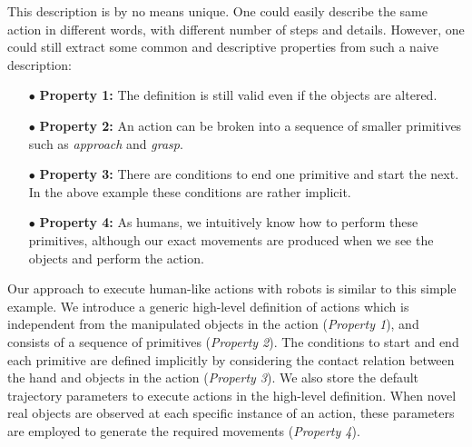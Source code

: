 This description is by no means unique.
One could easily describe the same action in different words, with different number of steps and  details.
However, one could still extract some common and descriptive properties from such a naive description:

\begin{itemize}
  \item[$\bullet$] \textbf{Property 1:} The definition is still valid even if the objects are altered.
  \item[$\bullet$] \textbf{Property 2:} An action can be broken into a sequence of smaller primitives such as \textit{approach} and \textit{grasp}.
  \item[$\bullet$] \textbf{Property 3:} There are conditions to end one primitive and start the next. In the above example these conditions are rather implicit.
  \item[$\bullet$] \textbf{Property 4:} As humans, we intuitively know how to  perform these primitives, although our exact movements are produced when we see the objects and perform the action.
\end{itemize}


Our approach to execute human-like actions with robots is similar to this simple example.
We introduce a generic high-level definition of actions which is independent from the manipulated objects in the action ({\it Property 1}),
and consists of a sequence of primitives ({\it Property 2}).
The conditions to start and end each primitive are defined %
implicitly by considering the contact relation between the hand and  objects in the action ({\it Property 3}).
We also store the default trajectory parameters to execute actions in the high-level definition.
When novel real objects are observed at each specific instance of an action, these parameters are employed to generate the required movements ({\it Property 4}).

